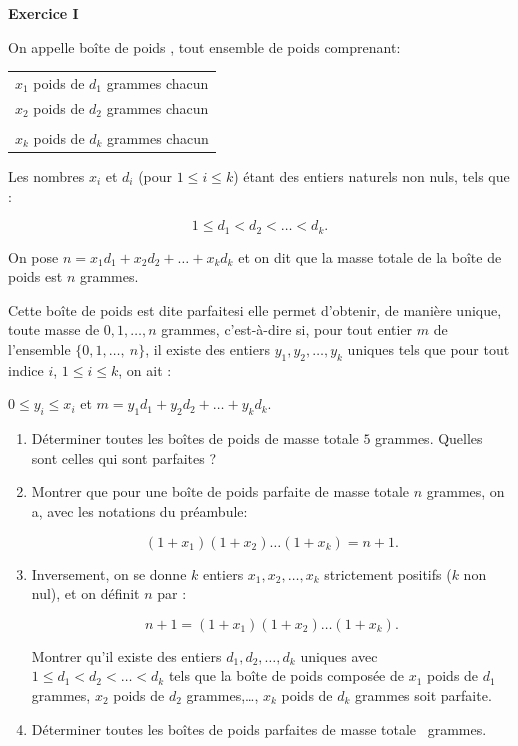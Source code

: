 \documentclass[a4paper,11pt]{article}
\begin{document}
\begin{center}\textbf{{\color{blue} Exercice I}}
\end{center}

On appelle \og boîte de poids \fg, tout ensemble de poids comprenant: 

\begin{center}
\begin{tabular}{l}
$x_1$ poids de $d_1$ grammes chacun\\
$x_2$ poids de $d_2$ grammes chacun\\
\dotfill\\
$x_k$ poids de $d_k$ grammes chacun\\
\end{tabular}
\end{center}

Les nombres $x_i$ et $d_i$ (pour $1 \leqslant i \leqslant k$) étant des entiers naturels non nuls, tels que :

\[1 \leqslant d_1 < d_2 < \dots  < d_k.\]

On pose $n=x_1d_1 + x_2d_2+ \ldots + x_kd_k$ et on dit que la masse totale de la boîte de poids est $n$ grammes.

Cette boîte de poids est dite \og parfaite\fg si elle permet d'obtenir, de manière unique, toute masse de $0, 1, \ldots , n$ grammes, c'est-à-dire si, pour tout entier $m$ de l'ensemble $\{0, 1, \ldots,~n\}$, il existe des entiers $y_1, y_2, \ldots , y_k$ uniques tels que pour tout indice $i$,\: $1 \leqslant i \leqslant k$, on ait :

$0 \leqslant y_i \leqslant x_i$ et $m = y_1d_1 + y_2d_2 + \ldots + y_kd_k$. 

\medskip

\begin{enumerate}
\item Déterminer toutes les boîtes de poids de masse totale $5$ grammes. Quelles sont celles qui sont parfaites ?
\item Montrer que pour une boîte de poids parfaite de masse totale $n$ grammes, on a, avec les notations du préambule:

\[\left(1 + x_1\right)\left(1 + x_2\right)\ldots \left(1 + x_k\right) = n + 1.\]

\item Inversement, on se donne $k$ entiers $x_1, x_2, \ldots , x_k$ strictement positifs ($k$ non nul), et on définit $n$ par :

\[n + 1  = \left(1 + x_1\right)\left(1 + x_2\right)\ldots \left(1 + x_k\right).\]

Montrer qu’il existe des entiers $d_1, d_2, \ldots, d_k$ uniques avec $1 \leqslant d_1 < d_2 < \ldots < d_k$
tels que la boîte de poids composée de $x_1$ poids de $d_1$ grammes, $x_2$ poids de $d_2$
grammes,\ldots , $x_k$ poids de $d_k$ grammes soit parfaite.
\item Déterminer toutes les boîtes de poids parfaites de masse totale ~grammes.
\end{enumerate}
\end{document}
